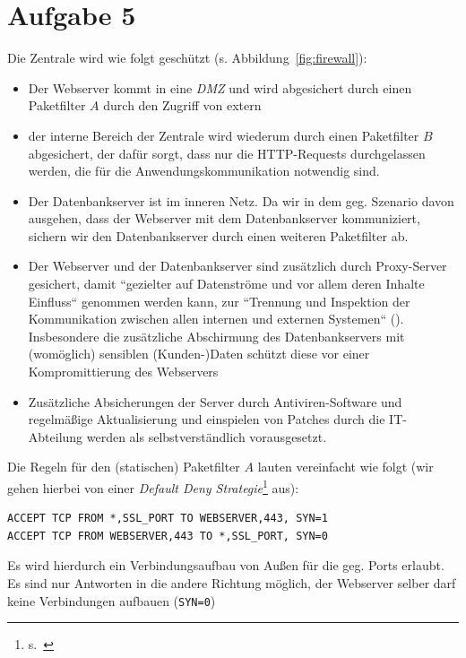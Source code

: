 \chapter{Aufgabe 5}

Die Zentrale wird wie folgt geschützt (s. Abbildung~\ref{fig:firewall}):

\begin{itemize}
    \itemsep0.5em
    \item Der Webserver kommt in eine \textit{DMZ} und wird abgesichert durch einen Paketfilter $A$ durch den Zugriff von extern
    \item der interne Bereich der Zentrale wird wiederum durch einen Paketfilter $B$ abgesichert, der dafür sorgt, dass nur die HTTP-Requests durchgelassen werden, die für die Anwendungskommunikation notwendig sind.
    \item Der Datenbankserver ist im inneren Netz. Da wir in dem geg. Szenario davon ausgehen, dass der Webserver mit dem Datenbankserver kommuniziert, sichern wir den Datenbankserver durch einen weiteren Paketfilter ab.
    \item Der Webserver und der Datenbankserver sind zusätzlich durch Proxy-Server gesichert, damit ``gezielter auf Datenströme und vor allem deren Inhalte Einfluss`` genommen werden kann, zur ``Trennung und Inspektion der Kommunikation zwischen allen internen und externen Systemen`` (\cite[77]{ITS4}).
    Insbesondere die zusätzliche Abschirmung des Datenbankservers mit (womöglich) sensiblen (Kunden-)Daten schützt diese vor einer Kompromittierung des Webservers
    \item Zusätzliche Absicherungen der Server durch Antiviren-Software und regelmäßige Aktualisierung und einspielen von Patches durch die IT-Abteilung werden als selbstverständlich vorausgesetzt.
\end{itemize}

\noindent
Die Regeln für den (statischen) Paketfilter $A$ lauten vereinfacht wie folgt (wir gehen hierbei von einer \textit{Default Deny Strategie}\footnote{
s.~\cite[68]{ITS4}
} aus):

\begin{verbatim}
ACCEPT TCP FROM *,SSL_PORT TO WEBSERVER,443, SYN=1
ACCEPT TCP FROM WEBSERVER,443 TO *,SSL_PORT, SYN=0
\end{verbatim}

\noindent
Es wird hierdurch ein Verbindungsaufbau von Außen für die geg. Ports erlaubt.
Es sind nur Antworten in die andere Richtung möglich, der Webserver selber darf keine Verbindungen aufbauen (\texttt{SYN=0})\\

